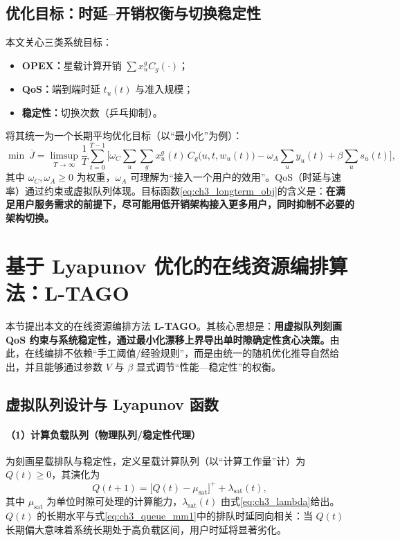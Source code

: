 \documentclass[type=master]{fduthesis}
\begin{document}
\subsection{优化目标：时延--开销权衡与切换稳定性}
\label{subsec:ch3_objective}

本文关心三类系统目标：
\begin{itemize}
  \item \textbf{OPEX：}星载计算开销 $\sum x_u^g C_g(\cdot)$；
  \item \textbf{QoS：}端到端时延 $t_u(t)$ 与准入规模；
  \item \textbf{稳定性：}切换次数（乒乓抑制）。
\end{itemize}

将其统一为一个长期平均优化目标（以“最小化”为例）：
\begin{equation}
\min
\ \overline{J}
=
\limsup_{T\to\infty}\frac{1}{T}\sum_{t=0}^{T-1}
\Bigg[
\omega_C \sum_{u}\sum_{g}x_u^g(t)\,C_g\big(u,t,w_u(t)\big)
-\omega_A\sum_{u}y_u(t)
+\beta\sum_{u} s_u(t)
\Bigg],
\label{eq:ch3_longterm_obj}
\end{equation}
其中 $\omega_C,\omega_A\ge 0$ 为权重，$\omega_A$ 可理解为“接入一个用户的效用”。QoS（时延与速率）通过约束或虚拟队列体现。目标函数\eqref{eq:ch3_longterm_obj}的含义是：\textbf{在满足用户服务需求的前提下，尽可能用低开销架构接入更多用户，同时抑制不必要的架构切换。}

\section{基于 Lyapunov 优化的在线资源编排算法：L-TAGO}
\label{sec:ch3_lyapunov}

本节提出本文的在线资源编排方法 \textbf{L-TAGO}。其核心思想是：\textbf{用虚拟队列刻画 QoS 约束与系统稳定性，通过最小化漂移上界导出单时隙确定性贪心决策。}由此，在线编排不依赖“手工阈值/经验规则”，而是由统一的随机优化推导自然给出，并且能够通过参数 $V$ 与 $\beta$ 显式调节“性能—稳定性”的权衡。

\subsection{虚拟队列设计与 Lyapunov 函数}
\label{subsec:ch3_virtual_queue}

\paragraph{（1）计算负载队列（物理队列/稳定性代理）}
为刻画星载排队与稳定性，定义星载计算队列（以“计算工作量”计）为 $Q(t)\ge 0$，其演化为
\begin{equation}
Q(t+1)=\Big[Q(t)-\mu_{\mathrm{sat}}\Big]^+ + \lambda_{\mathrm{sat}}(t),
\label{eq:ch3_Q_update}
\end{equation}
其中 $\mu_{\mathrm{sat}}$ 为单位时隙可处理的计算能力，$\lambda_{\mathrm{sat}}(t)$ 由式\eqref{eq:ch3_lambda}给出。$Q(t)$ 的长期水平与式\eqref{eq:ch3_queue_mm1}中的排队时延同向相关：当 $Q(t)$ 长期偏大意味着系统长期处于高负载区间，用户时延将显著劣化。
\end{document}

